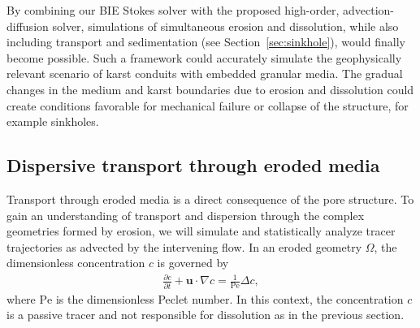 \documentclass[11pt]{article}
\newcommand{\pd}[2]{ \frac{ \partial #1}{ \partial #2 } }
\newcommand{\bvec}[1]{{\mathbf{#1}}}
\newcommand{\Pe}{\mathrm{Pe}}
\newcommand{\uu}{\bvec{u}}
\begin{document}
By combining our BIE Stokes solver with the proposed high-order, advection-diffusion solver, simulations of simultaneous erosion and dissolution, while also including transport and sedimentation (see Section~\ref{sec:sinkhole}), would finally become possible.  Such a framework could accurately simulate the geophysically relevant scenario of karst conduits with embedded granular media. The gradual changes in the medium and karst boundaries due to erosion and dissolution could create conditions favorable for mechanical failure or collapse of the structure, for example sinkholes.  

\subsection{Dispersive transport through eroded media}

Transport through eroded media is a direct consequence of the pore structure. To gain an understanding of transport and dispersion through the complex geometries formed by erosion, we will simulate and statistically analyze tracer trajectories as advected by the intervening flow. In an eroded geometry $\Omega$, the dimensionless concentration $c$ is governed by
\begin{align}
  \pd{c}{t} + \uu \cdot \nabla c = \frac{1}{\Pe} \Delta c, 
  \label{eqn:advectionDiffusion}
\end{align}
where $\Pe$ is the dimensionless Peclet number. In this context, the concentration $c$ is a passive tracer and not responsible for dissolution as in the previous section. 
\end{document}
